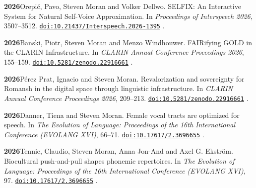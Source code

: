 \documentclass[11pt]{article}
\newcommand{\hangpara}{
 \setlength{\parindent}{0in} %
 \hangindent=0.42in %
}
\newcommand{\doi}[1]{%
  \href{https://doi.org/#1}{\nolinkurl{doi:#1}}%
}
\begin{document}

\vskip 6pt
\hangpara
{\bf 2026}\hspace{1ex}Orepić, Pavo, Steven Moran and Volker Dellwo. SELFIX: An Interactive System for Natural Self-Voice Approximation. In {\it Proceedings of Interspeech 2026}, 3507--3512. \doi{10.21437/Interspeech.2026-1395}.

\vskip 6pt
\hangpara
{\bf 2026}\hspace{1ex}Banski, Piotr, Steven Moran and Menzo Windhouwer. FAIRifying GOLD in the CLARIN Infrastructure. In {\it CLARIN Annual Conference Proceedings 2026}, 155--159. \doi{10.5281/zenodo.22916661}.

\vskip 6pt
\hangpara
{\bf 2026}\hspace{1ex}Pérez Prat, Ignacio and Steven Moran. Revalorization and sovereignty for Romansh in the digital space through linguistic infrastructure. In {\it CLARIN Annual Conference Proceedings 2026}, 209--213. \doi{10.5281/zenodo.22916661}.

\vskip 6pt
\hangpara
{\bf 2026}\hspace{1ex}Danner, Tiena and Steven Moran. Female vocal tracts are optimized for speech. In {\it The Evolution of Language: Proceedings of the 16th International Conference (EVOLANG XVI)}, 66--71. \doi{10.17617/2.3696655}.

\vskip 6pt
\hangpara
{\bf 2026}\hspace{1ex}Tennie, Claudio, Steven Moran, Anna Jon-And and Axel G. Ekström. Biocultural push-and-pull shapes phonemic repertoires. In {\it The Evolution of Language: Proceedings of the 16th International Conference (EVOLANG XVI)}, 97. \doi{10.17617/2.3696655}.
\end{document}
